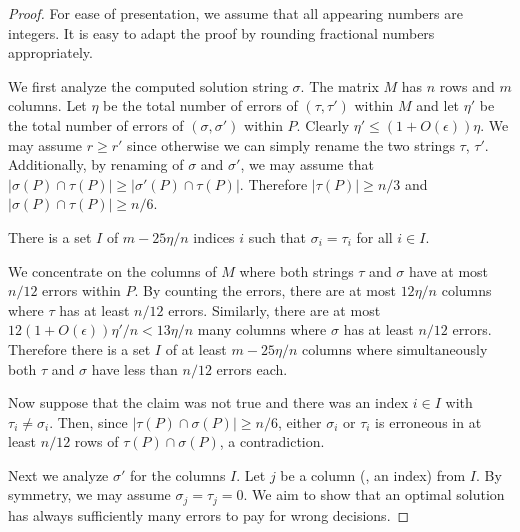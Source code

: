 \begin{proof}
    For ease of presentation, we assume that all appearing numbers are integers.
    It is easy to adapt the proof by rounding fractional numbers appropriately.
   
    We first analyze the computed solution string $\sigma$. 
    The matrix $M$ has $n$ rows and $m$ columns.
    Let $\eta$ be the total number of errors of $(\tau,\tau')$ within $M$ and
    let $\eta'$ be the total number of errors of $(\sigma,\sigma')$ within $P$.
    Clearly $\eta' \le (1+O(\epsilon)) \eta$.
    We may assume $r \ge r'$ since otherwise we can simply rename the two strings $\tau$, $\tau'$.
    Additionally, by renaming of $\sigma$ and $\sigma'$, we may assume that $|\sigma(P) \cap \tau(P)| \ge |\sigma'(P) \cap \tau(P)|$.
    Therefore $|\tau(P)| \ge n/3$ and $|\sigma(P) \cap \tau(P)| \ge n/6$.

    \begin{claim}\label{claim:agree}
        There is a set $I$ of $m - 25\eta/n$ indices $i$ such that
        $\sigma_i = \tau_i$ for all $i \in I$.
    \end{claim}
    \begin{subproof}
        We concentrate on the columns of $M$ where both strings $\tau$ and $\sigma$ have at most $n/12$ errors within $P$.
        By counting the errors, there are at most $12 \eta/n$ columns where $\tau$ has at least $n/12$ errors.
        Similarly, there are at most $12 (1+O(\epsilon)) \eta'/ n < 13 \eta/ n$ many columns where $\sigma$ has at least $n/12$ errors.
        Therefore there is a set $I$ of at least $m - 25\eta/n$ columns where simultaneously both $\tau$ and $\sigma$ have less than $n/12$ errors each.

        Now suppose that the claim was not true and there was an index $i \in I$ with $\tau_i \neq \sigma_i$.
        Then, since $|\tau(P) \cap \sigma(P)| \ge n/6$, either $\sigma_i$ or $\tau_i$ is erroneous in at least $n/12$ rows of $\tau(P) \cap \sigma(P)$, a contradiction.
    \end{subproof}
   Next we analyze $\sigma'$ for the columns $I$.
   Let $j$ be a column (\ie, an index) from $I$.
   By symmetry, we may assume $\sigma_j = \tau_j = 0$. 
   We aim to show that an optimal solution has always sufficiently many errors to pay for wrong decisions.


\end{proof}
